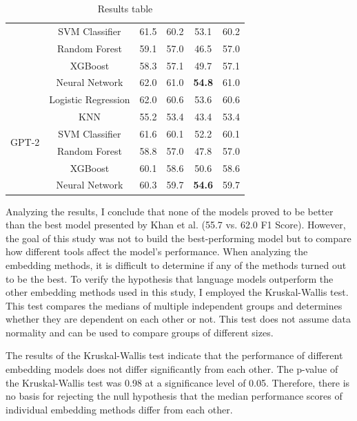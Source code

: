 \begin{table}[htb]
\begin{tabular}{l|c|c|c|c|c}
    & SVM Classifier & 61.5 & 60.2 & 53.1 & 60.2 \\
    & Random Forest & 59.1 & 57.0 & 46.5 & 57.0 \\
    & XGBoost & 58.3 & 57.1 & 49.7 & 57.1 \\
    & Neural Network & 62.0 & 61.0 & \textbf{54.8} & 61.0 \\
\hline
\multirow{6}{*}{GPT-2} 
    & Logistic Regression & 62.0 & 60.6 & 53.6 & 60.6 \\
    & KNN & 55.2 & 53.4 & 43.4 & 53.4 \\
    & SVM Classifier & 61.6 & 60.1 & 52.2 & 60.1 \\
    & Random Forest & 58.8 & 57.0 & 47.8 & 57.0 \\
    & XGBoost &  60.1 & 58.6 & 50.6 & 58.6 \\
    & Neural Network & 60.3 & 59.7 & \textbf{54.6} & 59.7 \\
\hline
\end{tabular}
\caption{Results table}
\label{results_table}
\end{table}

Analyzing the results, I conclude that none of the models proved to be better than the best model presented by Khan et al. (55.7 vs. 62.0 F1 Score). However, the goal of this study was not to build the best-performing model but to compare how different tools affect the model's performance. When analyzing the embedding methods, it is difficult to determine if any of the methods turned out to be the best. To verify the hypothesis that language models outperform the other embedding methods used in this study, I employed the Kruskal-Wallis test. This test compares the medians of multiple independent groups and determines whether they are dependent on each other or not. This test does not assume data normality and can be used to compare groups of different sizes.

The results of the Kruskal-Wallis test indicate that the performance of different embedding models does not differ significantly from each other. The p-value of the Kruskal-Wallis test was 0.98 at a significance level of 0.05. Therefore, there is no basis for rejecting the null hypothesis that the median performance scores of individual embedding methods differ from each other.

